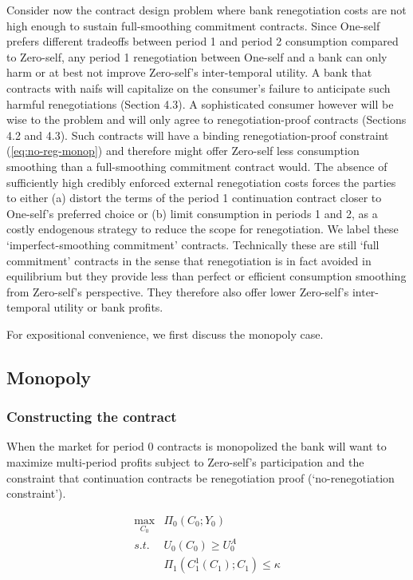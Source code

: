 \documentclass[11pt,english]{article}
\theoremstyle{plain}
\theoremstyle{definition}
\begin{document}
Consider now the contract design problem where bank renegotiation
costs are not high enough to sustain full-smoothing commitment contracts.
Since One-self prefers different tradeoffs between period 1 and period
2 consumption compared to Zero-self, any period 1 renegotiation between
One-self and a bank can only harm \textendash{} or at best not improve
\textendash{} Zero-self's inter-temporal utility. A bank that contracts
with naifs will capitalize on the consumer's failure to anticipate
such harmful renegotiations (Section 4.3). A sophisticated consumer
however will be wise to the problem and will only agree to renegotiation-proof
contracts (Sections 4.2 and 4.3). Such contracts will have a binding
renegotiation-proof constraint (\ref{eq:no-reg-monop}) and therefore
might offer Zero-self less consumption smoothing than a full-smoothing
commitment contract would. The absence of sufficiently high credibly
enforced external renegotiation costs forces the parties to either
(a) distort the terms of the period 1 continuation contract closer
to One-self's preferred choice or (b) limit consumption in periods
1 and 2, as a costly endogenous strategy to reduce the scope for renegotiation.
We label these `imperfect-smoothing commitment' contracts. Technically
these are still `full commitment' contracts in the sense that renegotiation
is in fact avoided in equilibrium but they provide less than perfect
or efficient consumption smoothing from Zero-self's perspective. They
therefore also offer lower Zero-self's inter-temporal utility or bank
profits.

For expositional convenience, we first discuss the monopoly case.

\subsection{Monopoly}

\subsubsection{Constructing the contract}

When the market for period 0 contracts is monopolized the bank will
want to maximize multi-period profits subject to Zero-self's participation
and the constraint that continuation contracts be renegotiation proof
(`no-renegotiation constraint').

\begin{align}
\max_{C_{0}} & \Pi_{0}\left(C_{0};Y_{0}\right)\\
s.t. & U_{0}\left(C_{0}\right)\geq U_{0}^{A}\\
 & \Pi_{1}\left(C_{1}^{1}\left(C_{1}\right);C_{1}\right)\leq\kappa\label{eq:rpc-m}
\end{align}
\end{document}

